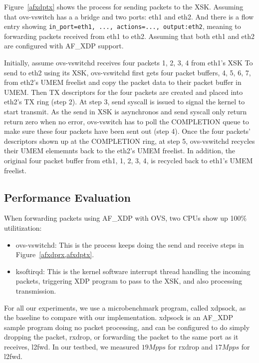 \documentclass[10pt]{sigplanconf}
\begin{document}
Figure~\ref{afxdptx} shows the process for sending packets to the XSK.
Assuming that ovs-vswitch has a a bridge and two ports: eth1 and eth2.
And there is a flow entry showing
\texttt{in\_port=eth1, ..., actions=..., output:eth2}, meaning to forwarding
packets received from eth1 to eth2.
Assuming that both eth1 and eth2 are configured with AF\_XDP support.

Initially, assume ovs-vswitchd receives four packets {1, 2, 3, 4} from eth1's XSK
To send to eth2 using its XSK, ovs-vswitchd first gets four packet buffers,
{4, 5, 6, 7}, from eth2's UMEM freelist and copy the packet data to their
packet buffer in UMEM.  Then TX descriptors for the four packets are
created and placed into eth2's TX ring (step 2).
At step 3, send syscall is issued to signal the kernel to start transmit.
As the send in XSK is asynchronos and send syscall only return return zero when
no error, ovs-vswitch has to poll the COMPLETION queue to make sure these four
packets have been sent out (step 4).
Once the four packets' descriptors shown up at the COMPLETION ring, at step 5,
ovs-vswitchd recycles their UMEM elememnts back to the eth2's UMEM freelist.
In addition, the original four packet buffer from eth1, {1, 2, 3, 4}, is
recycled back to eth1's UMEM freelist.

\subsection{Performance Evaluation}

When forwarding packets using AF\_XDP with OVS, two CPUs show up
100\% utilitization:
\begin{itemize}
\item ovs-vswitchd: This is the process keeps doing the send and receive steps
in Figure~\ref{afxdprx,afxdptx}.
\item ksoftirqd: This is the kernel software interrupt thread handling the
incoming packets, triggering XDP program to pass to the XSK, and also processing
transmission.
\end{itemize}

For all our experiments, we use a microbenchmark program, called xdpsock,
as the baseline to compare with our implementation.
xdpsock is an AF\_XDP sample program doing no packet processing, and can be configured
to do simply dropping the packet, rxdrop, or forwarding the packet to the same port as
it receives, l2fwd.  In our testbed, we measured $19Mpps$ for rxdrop and $17Mpps$ for
l2fwd.
\end{document}
